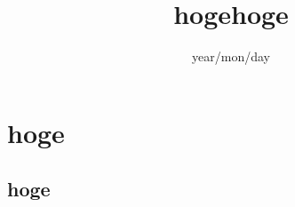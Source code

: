 \documentclass[11pt,a4j,twocolumn]{jsarticle}
\title{hogehoge}
\author{$BK-DT!!9(;](B}
\date{year/mon/day}
\begin{document}
\maketitle
\section{hoge}
\subsection{hoge}
\end{document}
